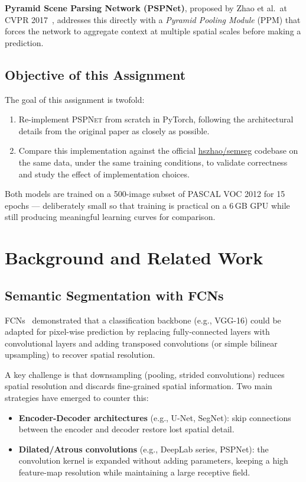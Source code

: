 \documentclass[12pt,a4paper]{article}
\newcommand{\pspnet}{\textsc{PSPNet}}
\begin{document}
\textbf{Pyramid Scene Parsing Network (PSPNet)}, proposed by Zhao et al.\ at
CVPR 2017~\cite{zhao2017}, addresses this directly with a \emph{Pyramid
Pooling Module} (PPM) that forces the network to aggregate context at multiple
spatial scales before making a prediction.

\subsection*{Objective of this Assignment}

The goal of this assignment is twofold:
\begin{enumerate}[noitemsep]
    \item Re-implement \pspnet{} from scratch in PyTorch, following the
          architectural details from the original paper as closely as possible.
    \item Compare this implementation against the official
          \href{https://github.com/hszhao/semseg}{hszhao/semseg} codebase on the
          same data, under the same training conditions, to validate correctness
          and study the effect of implementation choices.
\end{enumerate}

Both models are trained on a 500-image subset of PASCAL VOC 2012 for 15
epochs — deliberately small so that training is practical on a 6\,GB GPU
while still producing meaningful learning curves for comparison.

\section{Background and Related Work}

\subsection{Semantic Segmentation with FCNs}

FCNs~\cite{long2015} demonstrated that a classification backbone (e.g.,
VGG-16) could be adapted for pixel-wise prediction by replacing fully-connected
layers with convolutional layers and adding transposed convolutions (or simple
bilinear upsampling) to recover spatial resolution.

A key challenge is that downsampling (pooling, strided convolutions) reduces
spatial resolution and discards fine-grained spatial information.  Two main
strategies have emerged to counter this:
\begin{itemize}[noitemsep]
    \item \textbf{Encoder-Decoder architectures} (e.g., U-Net, SegNet): skip
          connections between the encoder and decoder restore lost spatial
          detail.
    \item \textbf{Dilated/Atrous convolutions} (e.g., DeepLab series, PSPNet):
          the convolution kernel is expanded without adding parameters, keeping
          a high feature-map resolution while maintaining a large receptive
          field.
\end{itemize}
\end{document}
